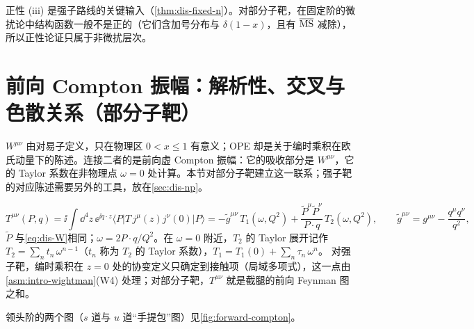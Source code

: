 正性 (iii) 是强子路线的关键输入（\cref{thm:dis-fixed-n}）。对部分子靶，在固定阶的微扰论中结构函数一般不是正的（它们含加号分布与 $\delta(1-x)$，且有 $\overline{\rm MS}$ 减除），所以正性论证只属于非微扰层次。

\section{前向 Compton 振幅：解析性、交叉与色散关系（部分子靶）}\label{sec:dis-compton}

$W^{\mu\nu}$ 由对易子定义，只在物理区 $0<x\le1$ 有意义；OPE 却是关于编时乘积在欧氏动量下的陈述。连接二者的是前向虚 Compton 振幅：它的吸收部分是 $W^{\mu\nu}$，它的 Taylor 系数在非物理点 $\omega=0$ 处计算。本节对部分子靶建立这一联系；强子靶的对应陈述需要另外的工具，放在\cref{sec:dis-np}。

\begin{definition}[前向 Compton 振幅]\label{def:dis-compton}
\begin{equation}\label{eq:dis-T}
T^{\mu\nu}(P,q)=\ii\int\dd^4z\,\ee^{\ii q\cdot z}\langle P|T\,j^\mu(z)j^\nu(0)|P\rangle
=-\tilde g^{\mu\nu}\,T_1(\omega,Q^2)+\frac{\tilde P^\mu\tilde P^\nu}{P\cdot q}\,T_2(\omega,Q^2),\qquad \tilde g^{\mu\nu}=g^{\mu\nu}-\frac{q^\mu q^\nu}{q^2},
\end{equation}
$\tilde P$ 与\cref{eq:dis-W}相同；$\omega=2P\cdot q/Q^2$。在 $\omega=0$ 附近，$T_2$ 的 Taylor 展开记作 $T_2=\sum_{n}t_n\,\omega^{n-1}$（$t_n$ 称为 $T_2$ 的 Taylor 系数），$T_1=T_1(0)+\sum_n\tau_n\,\omega^n$。%
对强子靶，编时乘积在 $z=0$ 处的协变定义只确定到接触项（局域多项式），这一点由\cref{asm:intro-wightman}(W4) 处理；对部分子靶，$T^{\mu\nu}$ 就是截腿的前向 Feynman 图之和。
\end{definition}

领头阶的两个图（$s$ 道与 $u$ 道“手提包”图）见\cref{fig:forward-compton}。

